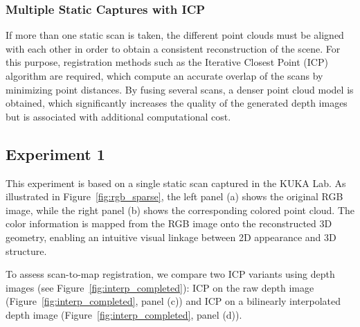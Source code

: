 \documentclass[english, bachelor, utf8]{base/thesis_telematics}
\begin{document}
\subsubsection*{Multiple Static Captures with ICP}
If more than one static scan is taken, the different point clouds must be aligned with each other in order to obtain 
a consistent reconstruction of the scene. For this purpose, registration methods such as the Iterative Closest Point 
(ICP) algorithm are required, which compute an accurate overlap of the scans by minimizing point distances. By fusing 
several scans, a denser point cloud model is obtained, which significantly increases the quality of the generated 
depth images but is associated with additional computational cost.



\subsection{Experiment 1}

This experiment is based on a single static scan captured in the KUKA Lab. As illustrated in
Figure~\ref{fig:rgb_sparse}, the left panel (a) shows the original RGB image, while the right panel (b)
shows the corresponding colored point cloud. The color information is mapped from the RGB image onto the
reconstructed 3D geometry, enabling an intuitive visual linkage between 2D appearance and 3D structure.

To assess scan-to-map registration, we compare two ICP variants using depth images (see
Figure~\ref{fig:interp_completed}): ICP on the raw depth image (Figure~\ref{fig:interp_completed}, panel
(c)) and ICP on a bilinearly interpolated depth image (Figure~\ref{fig:interp_completed}, panel (d)).
\end{document}
